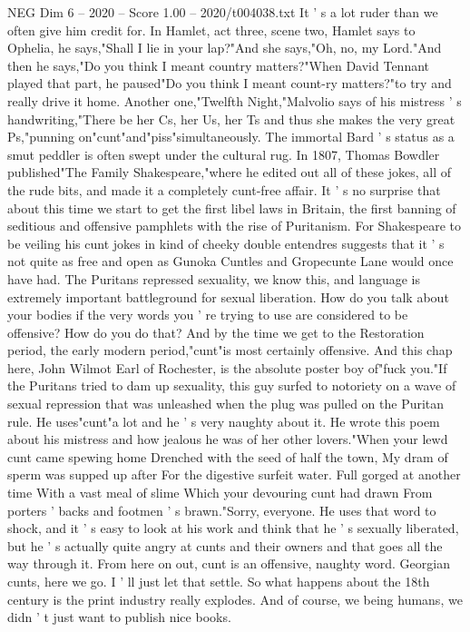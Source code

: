 \begin{textsample}{NEG Dim 6 – 2020 – Score 1.00 – 2020/t004038.txt}
It ' s a lot ruder than we often give him credit for.
In Hamlet, act three, scene two, Hamlet says to Ophelia, he says,"Shall I lie in your lap?"And she says,"Oh, no, my Lord."And then he says,"Do you think I meant country matters?"When David Tennant played that part, he paused"Do you think I meant count-ry matters?"to try and really drive it home.
Another one,"Twelfth Night,"Malvolio says of his mistress ' s handwriting,"There be her Cs, her Us, her Ts and thus she makes the very great Ps,"punning on"cunt"and"piss"simultaneously.
The immortal Bard ' s status as a smut peddler is often swept under the cultural rug.
In 1807, Thomas Bowdler published"The Family Shakespeare,"where he edited out all of these jokes, all of the rude bits, and made it a completely cunt-free affair.
It ' s no surprise that about this time we start to get the first libel laws in Britain, the first banning of seditious and offensive pamphlets with the rise of Puritanism.
For Shakespeare to be veiling his cunt jokes in kind of cheeky double entendres suggests that it ' s not quite as free and open as Gunoka Cuntles and Gropecunte Lane would once have had.
The Puritans repressed sexuality, we know this, and language is extremely important battleground for sexual liberation.
How do you talk about your bodies if the very words you ' re trying to use are considered to be offensive?
How do you do that?
And by the time we get to the Restoration period, the early modern period,"cunt"is most certainly offensive.
And this chap here, John Wilmot Earl of Rochester, is the absolute poster boy of"fuck you."If the Puritans tried to dam up sexuality, this guy surfed to notoriety on a wave of sexual repression that was unleashed when the plug was pulled on the Puritan rule.
He uses"cunt"a lot and he ' s very naughty about it.
He wrote this poem about his mistress and how jealous he was of her other lovers."When your lewd cunt came spewing home Drenched with the seed of half the town, My dram of sperm was supped up after For the digestive surfeit water.
Full gorged at another time With a vast meal of slime Which your devouring cunt had drawn From porters ' backs and footmen ' s brawn."Sorry, everyone.
He uses that word to shock, and it ' s easy to look at his work and think that he ' s sexually liberated, but he ' s actually quite angry at cunts and their owners and that goes all the way through it.
From here on out, cunt is an offensive, naughty word.
Georgian cunts, here we go.
I ' ll just let that settle.
So what happens about the 18th century is the print industry really explodes.
And of course, we being humans, we didn ' t just want to publish nice books.

\end{textsample}
